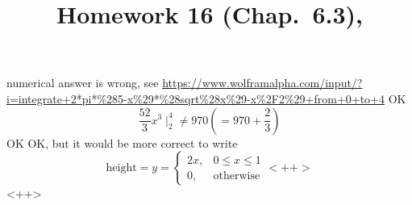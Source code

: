 \documentclass[10pt]{article} %
\title{Homework 16 (Chap.~6.3),
}
\begin{document}
\maketitle
{}
numerical answer is wrong, see
\url{https://www.wolframalpha.com/input/?i=integrate+2*pi*\%285-x\%29*\%28sqrt\%28x\%29-x\%2F2\%29+from+0+to+4}
OK
\begin{equation*}
	\frac{52}{3}x^3\mid^4_2\neq 970 \left( =970+\frac{2}{3} \right)
\end{equation*}
OK
OK, but it would be more correct to write
\begin{equation*}
	\mbox{height}=y=\begin{cases}
		2x,&0\le x\le1\\
		0,&\mbox{otherwise}
	\end{cases}<++>
\end{equation*}<++>
\end{document}

